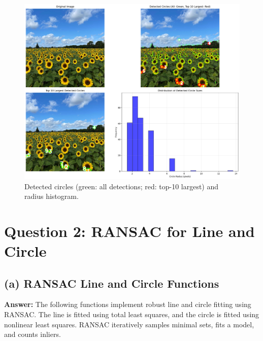 \documentclass[10pt,a4paper,twocolumn]{article}
\begin{document}
\vspace{2pt}

\begin{figure}[H]
\centering
\includegraphics[width=0.95\columnwidth]{fig/Q1_detected_circles_and_hist.png}
\caption{Detected circles (green: all detections; red: top-10 largest) and radius histogram.}
\label{fig:q1_detected}
\end{figure}



\section{Question 2: RANSAC for Line and Circle}

\subsection*{(a) RANSAC Line and Circle Functions}
\textbf{Answer:} The following functions implement robust line and circle fitting using RANSAC. The line is fitted using total least squares, and the circle is fitted using nonlinear least squares. RANSAC iteratively samples minimal sets, fits a model, and counts inliers.
\end{document}

